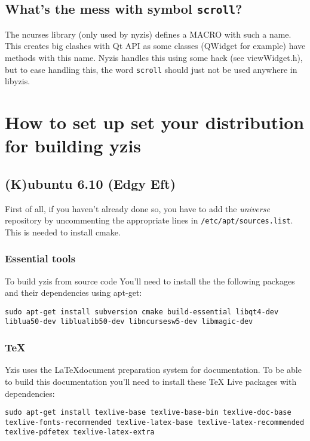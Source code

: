\documentclass[a4paper,12pt]{report}
\begin{document}
\section{What's the mess with symbol \texttt{scroll}?}

The ncurses library (only used by nyzis) defines a MACRO with such a name.
This creates big clashes with Qt API as some classes (QWidget for example)
have methods with this name. Nyzis handles this using some hack (see
viewWidget.h), but to ease handling this, the word \verb+scroll+ should
just not be used anywhere in libyzis.

\appendix

\chapter{How to set up set your distribution for building yzis}

\section{(K)ubuntu 6.10 (Edgy Eft)}

First of all, if you haven't already done so, you have to add the
\emph{universe} repository by uncommenting the appropriate lines in
\texttt{/etc/apt/sources.list}. This is needed to install cmake.

\subsection{Essential tools}
To build yzis from source code You'll need to install the the following packages
and their dependencies using apt-get:

\texttt{sudo apt-get install subversion cmake build-essential libqt4-dev liblua50-dev
liblualib50-dev libncursesw5-dev libmagic-dev}

\subsection{\TeX}

Yzis uses the \LaTeX document preparation system for documentation. To be able
to build this documentation you'll need to install these \TeX{} Live packages
with dependencies:

\texttt{sudo apt-get install texlive-base texlive-base-bin texlive-doc-base
texlive-fonts-recommended texlive-latex-base texlive-latex-recommended
texlive-pdfetex texlive-latex-extra}
\end{document}
